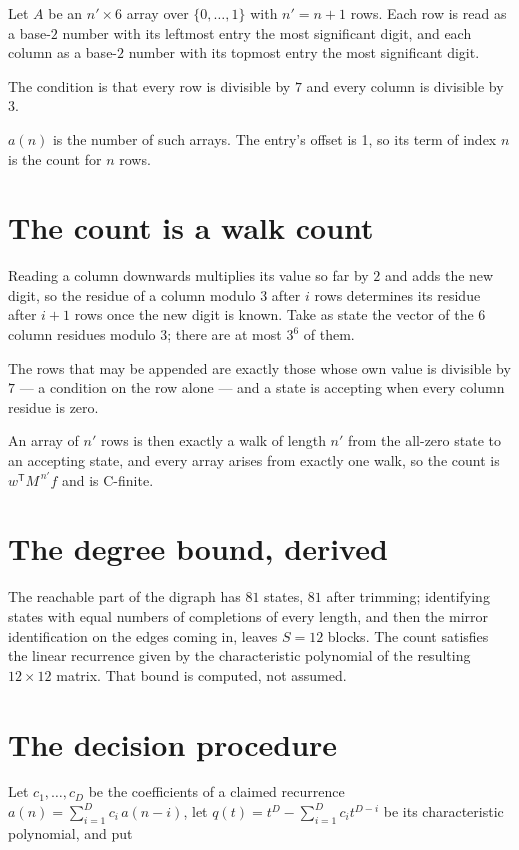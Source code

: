 \documentclass[11pt]{article}
\theoremstyle{definition}
\begin{document}
Let $A$ be an $n' \times 6$ array over $\{0,\dots,1\}$ with $n' = n + 1$ rows. Each row is read as a base-$2$ number with its leftmost entry the most significant digit, and each column as a base-$2$ number with its topmost entry the most significant digit.

The condition is that every row is divisible by $7$ and every column is divisible by $3$.

$a(n)$ is the number of such arrays. The entry's offset is 1, so its term of index $n$ is the count for $n$ rows.

\section{The count is a walk count}

Reading a column downwards multiplies its value so far by $2$ and adds the new digit, so the residue of a column modulo $3$ after $i$ rows determines its residue after $i+1$ rows once the new digit is known. Take as state the vector of the $6$ column residues modulo $3$; there are at most $3^{6}$ of them.

The rows that may be appended are exactly those whose own value is divisible by $7$ --- a condition on the row alone --- and a state is accepting when every column residue is zero.

An array of $n'$ rows is then exactly a walk of length $n'$ from the all-zero state to an accepting state, and every array arises from exactly one walk, so the count is $w^{\mathsf T}M^{\,n'}f$ and is C-finite.

\section{The degree bound, derived}

The reachable part of the digraph has $81$ states, $81$ after trimming; identifying states with equal numbers of completions of every length, and then the mirror identification on the edges coming in, leaves $S = 12$ blocks. The count satisfies the linear recurrence given by the characteristic polynomial of the resulting $12\times12$ matrix. That bound is computed, not assumed.

\section{The decision procedure}

Let $c_1,\dots,c_D$ be the coefficients of a claimed recurrence $a(n) = \sum_{i=1}^{D} c_i\,a(n-i)$, let $q(t) = t^{D} - \sum_{i=1}^{D} c_i t^{D-i}$ be its characteristic polynomial, and put
\end{document}
